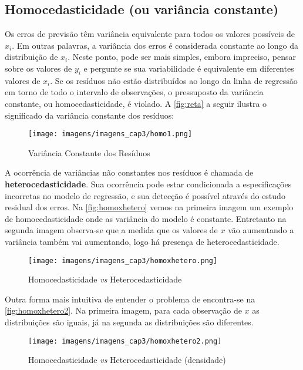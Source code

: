 \subsection{Homocedasticidade (ou variância constante)}

\noindent Os erros de previsão têm variância equivalente para todos os valores possíveis de $x_i$. Em outras palavras, a variância dos erros é considerada constante ao longo da distribuição de $x_i$. Neste ponto, pode ser mais simples, embora impreciso, pensar sobre os valores de $y_i$ e pergunte se sua variabilidade é equivalente em diferentes valores de $x_i$. Se os resíduos não estão distribuídos ao longo da linha de regressão em torno de todo o intervalo de observações, o pressuposto da variância constante, ou homocedasticidade, é violado. A \autoref{fig:reta} a seguir ilustra o significado da variância constante dos resíduos:

\begin{figure}[H]
\centering
\caption{Variância Constante dos Resíduos}
\texttt{[image: imagens/imagens\_cap3/homo1.png]}
\label{fig:reta}
\end{figure}

A  ocorrência  de  variâncias  não  constantes  nos  resíduos  é  chamada  de \textbf{heterocedasticidade}.  Sua  ocorrência  pode  estar  condicionada  a  especificações incorretas  no  modelo  de  regressão,  e  sua  detecção  é  possível  através  do  estudo residual dos erros. Na \autoref{fig:homoxhetero} vemos na primeira imagem um exemplo de homocedasticidade onde as variância do modelo é constante. Entretanto na segunda imagem observa-se que a medida que os valores de $x$ vão aumentando a variância também vai aumentando, logo há presença de heterocedasticidade.

\begin{figure}[H]
\centering
\caption{Homocedasticidade \textit{vs} Heterocedasticidade}
\texttt{[image: imagens/imagens\_cap3/homoxhetero.png]}
\label{fig:homoxhetero}
\end{figure}

\noindent Outra forma mais intuitiva de entender o problema de encontra-se na \autoref{fig:homoxhetero2}. Na primeira imagem, para cada observação de $x$ as distribuições são iguais, já na segunda as distribuições são diferentes.

\begin{figure}[H]
\centering
\caption{Homocedasticidade \textit{vs} Heterocedasticidade (densidade)}
\texttt{[image: imagens/imagens\_cap3/homoxhetero2.png]}
\label{fig:homoxhetero2}
\end{figure}



